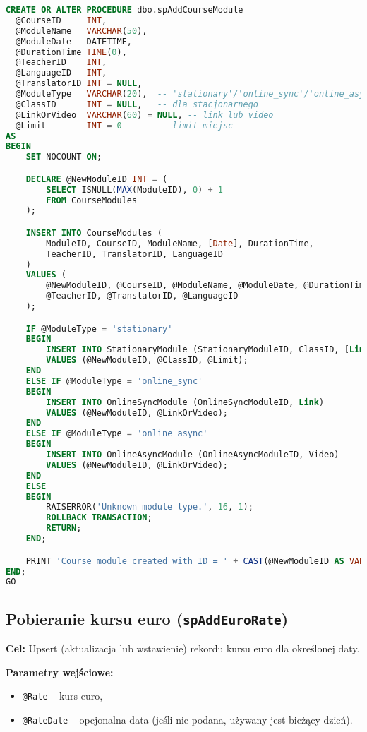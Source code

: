 \documentclass[12pt]{article}
\begin{document}
\begin{lstlisting}[language=SQL]
CREATE OR ALTER PROCEDURE dbo.spAddCourseModule
  @CourseID     INT,
  @ModuleName   VARCHAR(50),
  @ModuleDate   DATETIME,
  @DurationTime TIME(0),
  @TeacherID    INT,
  @LanguageID   INT,
  @TranslatorID INT = NULL,
  @ModuleType   VARCHAR(20),  -- 'stationary'/'online_sync'/'online_async'
  @ClassID      INT = NULL,   -- dla stacjonarnego
  @LinkOrVideo  VARCHAR(60) = NULL, -- link lub video
  @Limit        INT = 0       -- limit miejsc
AS
BEGIN
    SET NOCOUNT ON;

    DECLARE @NewModuleID INT = (
        SELECT ISNULL(MAX(ModuleID), 0) + 1
        FROM CourseModules
    );

    INSERT INTO CourseModules (
        ModuleID, CourseID, ModuleName, [Date], DurationTime,
        TeacherID, TranslatorID, LanguageID
    )
    VALUES (
        @NewModuleID, @CourseID, @ModuleName, @ModuleDate, @DurationTime,
        @TeacherID, @TranslatorID, @LanguageID
    );

    IF @ModuleType = 'stationary'
    BEGIN
        INSERT INTO StationaryModule (StationaryModuleID, ClassID, [Limit])
        VALUES (@NewModuleID, @ClassID, @Limit);
    END
    ELSE IF @ModuleType = 'online_sync'
    BEGIN
        INSERT INTO OnlineSyncModule (OnlineSyncModuleID, Link)
        VALUES (@NewModuleID, @LinkOrVideo);
    END
    ELSE IF @ModuleType = 'online_async'
    BEGIN
        INSERT INTO OnlineAsyncModule (OnlineAsyncModuleID, Video)
        VALUES (@NewModuleID, @LinkOrVideo);
    END
    ELSE
    BEGIN
        RAISERROR('Unknown module type.', 16, 1);
        ROLLBACK TRANSACTION;
        RETURN;
    END;

    PRINT 'Course module created with ID = ' + CAST(@NewModuleID AS VARCHAR(10));
END;
GO
\end{lstlisting}

\newpage
\subsection{Pobieranie kursu euro (\texttt{spAddEuroRate})}
\textbf{Cel:} Upsert (aktualizacja lub wstawienie) rekordu kursu euro dla określonej daty.

\textbf{Parametry wejściowe:}
\begin{itemize}
  \item \verb|@Rate| – kurs euro,
  \item \verb|@RateDate| – opcjonalna data (jeśli nie podana, używany jest bieżący dzień).
\end{itemize}
\end{document}
